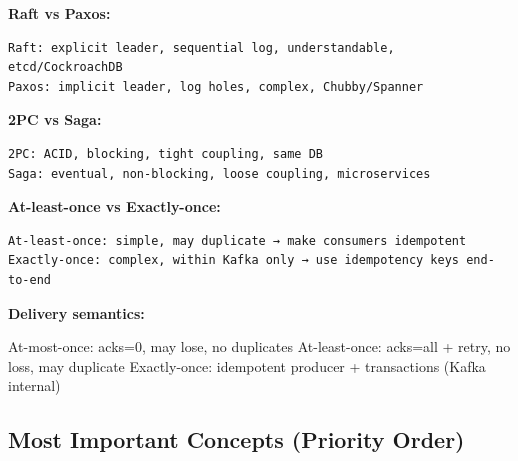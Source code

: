 \documentclass[11pt]{article}
\newenvironment{Shaded}{\begin{snugshade}}{\end{snugshade}}
\newcommand{\BuiltInTok}[1]{\textcolor[rgb]{0.50,0.55,0.55}{#1}}
\newcommand{\DecValTok}[1]{\textcolor[rgb]{0.96,0.45,0.00}{#1}}
\newcommand{\NormalTok}[1]{\textcolor[rgb]{0.81,0.81,0.76}{#1}}
\newcommand{\OperatorTok}[1]{\textcolor[rgb]{0.81,0.81,0.76}{#1}}
\begin{document}
\textbf{Raft vs Paxos:}

\setcodelang{}

\begin{verbatim}
Raft: explicit leader, sequential log, understandable, etcd/CockroachDB
Paxos: implicit leader, log holes, complex, Chubby/Spanner
\end{verbatim}

\textbf{2PC vs Saga:}

\setcodelang{}

\begin{verbatim}
2PC: ACID, blocking, tight coupling, same DB
Saga: eventual, non-blocking, loose coupling, microservices
\end{verbatim}

\textbf{At-least-once vs Exactly-once:}

\setcodelang{}

\begin{verbatim}
At-least-once: simple, may duplicate → make consumers idempotent
Exactly-once: complex, within Kafka only → use idempotency keys end-to-end
\end{verbatim}

\textbf{Delivery semantics:}


\begin{Shaded}
\begin{Highlighting}[]
\NormalTok{At}\OperatorTok{{-}}\NormalTok{most}\OperatorTok{{-}}\NormalTok{once: acks}\OperatorTok{=}\DecValTok{0}\NormalTok{, may lose, no duplicates}
\NormalTok{At}\OperatorTok{{-}}\NormalTok{least}\OperatorTok{{-}}\NormalTok{once: acks}\OperatorTok{=}\BuiltInTok{all} \OperatorTok{+}\NormalTok{ retry, no loss, may duplicate}
\NormalTok{Exactly}\OperatorTok{{-}}\NormalTok{once: idempotent producer }\OperatorTok{+}\NormalTok{ transactions (Kafka internal)}
\end{Highlighting}
\end{Shaded}

\subsection{Most Important Concepts (Priority Order)}\label{most-important-concepts-priority-order}
\end{document}
